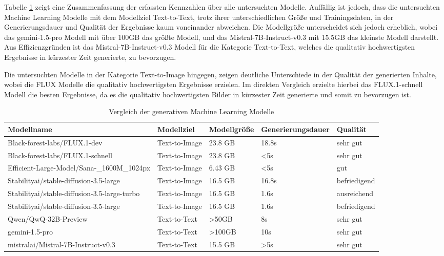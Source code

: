 Tabelle \ref{tab:table_modellvergleich} zeigt eine Zusammenfassung der erfassten Kennzahlen über alle untersuchten Modelle.
Auffällig ist jedoch, dass die untersuchten Machine Learning Modelle mit dem Modellziel Text-to-Text, trotz ihrer unterschiedlichen Größe und Trainingsdaten, in der Generierungsdauer und Qualität der Ergebnisse kaum voneinander abweichen.
Die Modellgröße unterscheidet sich jedoch erheblich, wobei das gemini-1.5-pro Modell mit über 100GB das größte Modell, und das Mistral-7B-Instruct-v0.3 mit 15.5GB das kleinste Modell darstellt.
Aus Effizienzgründen ist das Mistral-7B-Instruct-v0.3 Modell für die Kategorie Text-to-Text, welches die qualitativ hochwertigsten Ergebnisse in kürzester Zeit generierte, zu bevorzugen.

Die untersuchten Modelle in der Kategorie Text-to-Image hingegen, zeigen deutliche Unterschiede in der Qualität der generierten Inhalte, wobei die FLUX Modelle die qualitativ hochwertigsten Ergebnisse erzielen.
Im direkten Vergleich erzielte hierbei das FLUX.1-schnell Modell die besten Ergebnisse, da es die qualitativ hochwertigsten Bilder in kürzester Zeit generierte und somit zu bevorzugen ist.

\begin{table}[t]
  \centering
  \begin{tabular}{|p{3cm}|p{3cm}|p{2cm}|p{2cm}|p{3cm}|}
      \hline
      \textbf{Modellname} & \textbf{Modellziel} & \textbf{Modellgröße} & \textbf{Generierungsdauer} & \textbf{Qualität}\\ \hline
      {Black-forest-labs/FLUX.1-dev} & Text-to-Image & 23.8 GB & 18.8s & sehr gut\\ \hline
      {Black-forest-labs/FLUX.1-schnell} & Text-to-Image & 23.8 GB & \textless 5s & sehr gut\\ \hline
      {Efficient-Large-Model/Sana-\_1600M\_1024px} & Text-to-Image & 6.43 GB & \textless 5s & gut\\ \hline
      {Stabilityai/stable-diffusion-3.5-large} & Text-to-Image & 16.5 GB & 16.8s & befriedigend\\ \hline
      {Stabilityai/stable-diffusion-3.5-large-turbo} & Text-to-Image & 16.5 GB & 1.6s & ausreichend\\ \hline
      {Stabilityai/stable-diffusion-3.5-large} & Text-to-Image & 16.5 GB & 1.6s& befriedigend\\ \hline
      {Qwen/QwQ-32B-Preview} & Text-to-Text & \textgreater 50GB & 8s & sehr gut\\ \hline
      {gemini-1.5-pro} & Text-to-Text & \textgreater 100GB & 10s & sehr gut\\ \hline
      {mistralai/Mistral-7B-Instruct-v0.3} & Text-to-Text & 15.5 GB & \textgreater5s & sehr gut\\ \hline
  \end{tabular}
  \caption{Vergleich der generativen Machine Learning Modelle}\label{tab:table_modellvergleich}
\end{table}


